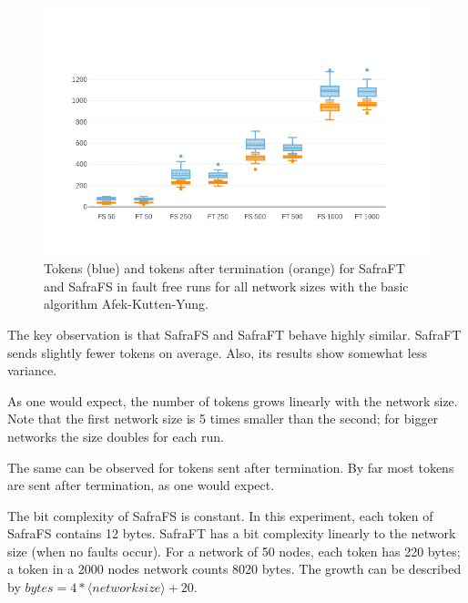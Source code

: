\begin{figure}
    \includegraphics{figures/tokens-aky.png}
    \caption{Tokens (blue) and tokens after termination (orange) for SafraFT and SafraFS in fault free runs for all network sizes with the basic algorithm Afek-Kutten-Yung.}
    \label{fig:tokens-and-tokens-after-aky}
\end{figure}


The key observation is that SafraFS and SafraFT behave highly similar.
SafraFT sends slightly fewer tokens on average.
Also, its results show somewhat less variance.

As one would expect, the number of tokens grows linearly with the network size.
Note that the first network size is 5 times smaller than the second; for bigger networks the size doubles for each run.

The same can be observed for tokens sent after termination.
By far most tokens are sent after termination, as one would expect.

The bit complexity of SafraFS is constant.
In this experiment, each token of SafraFS contains 12 bytes.
SafraFT has a bit complexity linearly to the network size (when no faults occur).
For a network of 50 nodes, each token has 220 bytes; a token in a 2000 nodes network counts 8020 bytes.
The growth can be described by $bytes = 4 * \langle network size\rangle + 20$.

